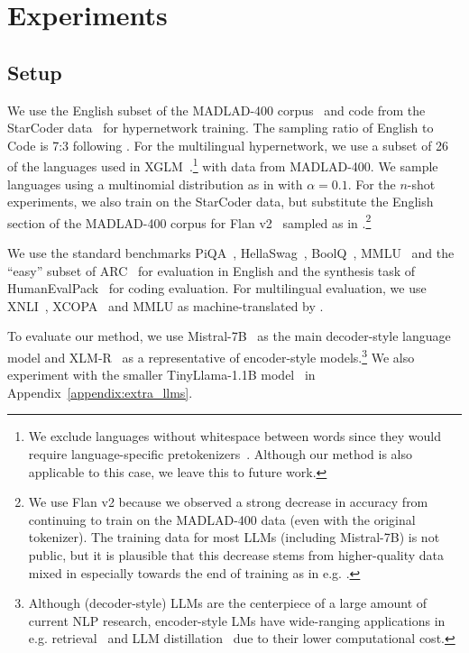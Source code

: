 \documentclass{article}
\begin{document}
\section{Experiments}
\label{sec:experiments}




\subsection{Setup}
\label{subsec:setup}


 We use the English subset of the MADLAD-400 corpus~\citep{kudugunta2023madlad400} and code from the StarCoder data~\citep{li2023starcoder} for hypernetwork training. The sampling ratio of English to Code is 7:3 following \citet{zhang2024tinyllama}. For the multilingual hypernetwork, we use a subset of 26 of the languages used in XGLM~\citep{lin-etal-2022-shot}.\footnote{We exclude languages without whitespace between words since they would require language-specific pretokenizers~\citep[e.g.][]{sun2012jieba}. Although our method is also applicable to this case, we leave this to future work.} with data from MADLAD-400. We sample languages using a multinomial distribution as in \citet{NEURIPS2019_c04c19c2} with $\alpha=0.1$. For the $n$-shot experiments, we also train on the StarCoder data, but substitute the English section of the MADLAD-400 corpus for Flan v2~\citep{longpre2023flan} sampled as in \citet{dolma}.\footnote{We use Flan v2 because we observed a strong decrease in accuracy from continuing to train on the MADLAD-400 data (even with the original tokenizer). The training data for most LLMs (including Mistral-7B) is not public, but it is plausible that this decrease stems from higher-quality data mixed in especially towards the end of training as in e.g. \citet{Groeneveld2023OLMo}.} 

 We use the standard benchmarks PiQA~\citep{Bisk2020}, HellaSwag~\citep[HS][]{zellers-etal-2019-hellaswag}, BoolQ~\citep{clark-etal-2019-boolq}, MMLU~\citep{hendryckstest2021} and the ``easy'' subset of ARC~\citep{allenai:arc} for evaluation in English and the synthesis task of HumanEvalPack~\citep{muennighoff2023octopack} for coding evaluation. For multilingual evaluation, we use XNLI~\citep{conneau-etal-2018-xnli}, XCOPA~\citep{ponti-etal-2020-xcopa} and MMLU as machine-translated by \citet{lai-etal-2023-okapi}. 

 To evaluate our method, we use Mistral-7B~\citep{jiang2023mistral} as the main decoder-style language model and XLM-R~\citep{conneau-etal-2020-unsupervised} as a representative of encoder-style models.\footnote{Although (decoder-style) LLMs are the centerpiece of a large amount of current NLP research, encoder-style LMs have wide-ranging applications in e.g. retrieval~\citep{colbert} and LLM distillation~\citep{hsieh-etal-2023-distilling} due to their lower computational cost.} We also experiment with the smaller TinyLlama-1.1B model~\citep{zhang2024tinyllama} in Appendix~\ref{appendix:extra_llms}.
\end{document}
